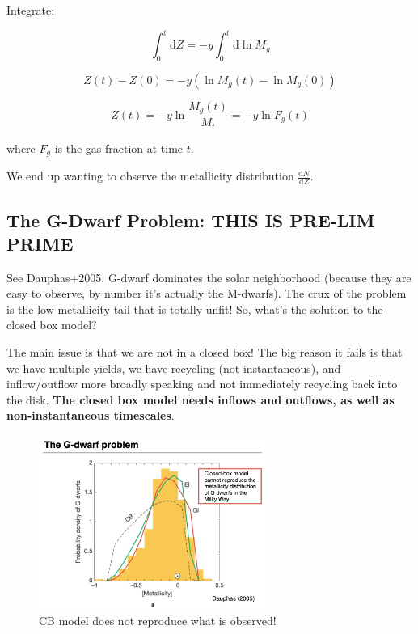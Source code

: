 \documentclass{article}
\begin{document}
Integrate:

\begin{equation}
    \int_0^t \mathrm{d} Z = -y \int_0^t \mathrm{d}\ln{M_g}
\end{equation}

\begin{equation}
    Z(t) - Z(0) = -y\left(\ln{M_g(t)} - \ln{M_g(0)}\right)
\end{equation}

\begin{equation}
    \boxed{Z(t) = -y \ln{\frac{M_g(t)}{M_t}} = - y \ln{F_g(t)}}
\end{equation}

where $F_g$ is the gas fraction at time $t$. 

We end up wanting to observe the metallicity distribution $\frac{\mathrm{d}N}{\mathrm{d}Z}$. 

\subsection{The G-Dwarf Problem: THIS IS PRE-LIM PRIME}

See Dauphas+2005. G-dwarf dominates the solar neighborhood (because they are easy to observe, by number it's actually the M-dwarfs). The crux of the problem is the low metallicity tail that is totally unfit! So, what's the solution to the closed box model?

The main issue is that we are not in a closed box! The big reason it fails is that we have multiple yields, we have recycling (not instantaneous), and inflow/outflow more broadly speaking and not immediately recycling back into the disk. \textbf{The closed box model needs inflows and outflows, as well as non-instantaneous timescales}.

\begin{figure}
    \centering
    \includegraphics[width=0.66\textwidth]{figs/Screen Shot 2021-10-08 at 10.26.28 AM.png}
    \caption{CB model does not reproduce what is observed!}
    \label{fig:g_dwarf_problem}
\end{figure}
\end{document}
